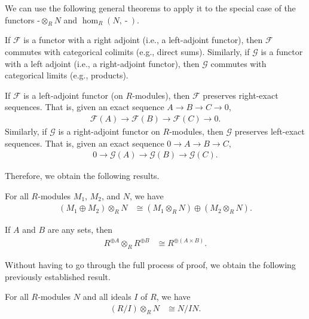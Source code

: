 \documentclass[10pt]{mypackage}
\begin{document}
We can use the following general theorems to apply it to the special case of the functors $ \operatorname{-}\otimes_{R}N $ and $\hom_{R}\left( N,\operatorname{-} \right)$.
\begin{theorem}
  If $ \mathcal{F} $ is a functor with a right adjoint (i.e., a left-adjoint functor), then $ \mathcal{F} $ commutes with categorical colimits (e.g., direct sums). Similarly, if $\mathcal{G}$ is a functor with a left adjoint (i.e., a right-adjoint functor), then $ \mathcal{G} $ commutes with categorical limits (e.g., products).
\end{theorem}
\begin{theorem}
  If $ \mathcal{F} $ is a left-adjoint functor (on $R$-modules), then $ \mathcal{F} $ preserves right-exact sequences. That is, given an exact sequence $A\rightarrow B\rightarrow C\rightarrow 0$,
  \begin{align*}
    \mathcal{F}\left( A \right)\rightarrow \mathcal{F}\left( B \right)\rightarrow \mathcal{F}\left( C \right)\rightarrow 0.
  \end{align*}
  Similarly, if $\mathcal{G}$ is a right-adjoint functor on $R$-modules, then $\mathcal{G}$ preserves left-exact sequences. That is, given an exact sequence $0\rightarrow A\rightarrow B\rightarrow C$,
  \begin{align*}
    0 \rightarrow \mathcal{G}\left( A \right)\rightarrow \mathcal{G}\left( B \right)\rightarrow \mathcal{G}\left( C \right).
  \end{align*}
\end{theorem}
Therefore, we obtain the following results.
\begin{corollary}
  For all $R$-modules $M_1$, $M_2$, and $N$, we have
  \begin{align*}
    \left( M_1\oplus M_2 \right)\otimes_{R}N &\cong \left( M_1\otimes_{R}N \right)\oplus \left( M_2\otimes_{R}N \right).
  \end{align*}
\end{corollary}
\begin{corollary}
  If $A$ and $B$ are any sets, then
  \begin{align*}
    R^{\oplus A}\otimes_{R}R^{\oplus B} &\cong R^{\oplus \left( A\times B \right)}.
  \end{align*}
\end{corollary}
Without having to go through the full process of proof, we obtain the following previously established result.
\begin{corollary}
  For all $R$-modules $N$ and all ideals $I$ of $R$, we have
  \begin{align*}
    \left( R/I \right)\otimes_{R}N &\cong N/IN.
  \end{align*}
\end{corollary}
\end{document}
